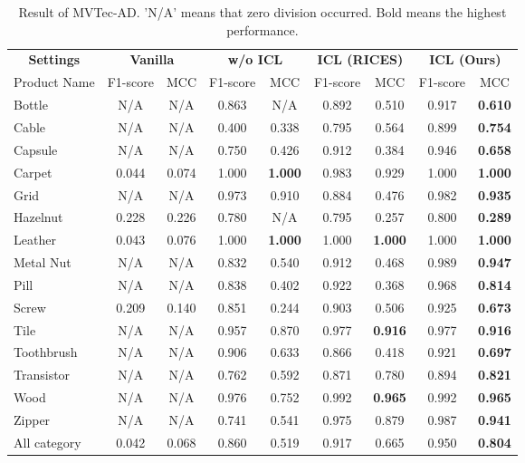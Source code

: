 \begin{table*}[!tb]
\caption{Result of MVTec-AD. 'N/A' means that zero division occurred. Bold means the highest performance.}
\label{tab:result_mvtec}
\centering
\begin{tabular}{lcccccccc}
\toprule
\multicolumn{1}{c}{\textbf{Settings}} & \multicolumn{2}{c}{\textbf{Vanilla}} & \multicolumn{2}{c}{\textbf{w/o ICL}} & \multicolumn{2}{c}{\textbf{ICL (RICES)}} & \multicolumn{2}{c}{\textbf{ICL (Ours)}} \\
\cmidrule(r){1-9}
\multicolumn{1}{c}{Product Name} & F1-score & MCC & F1-score & MCC & F1-score & MCC & F1-score & MCC \\
\midrule
Bottle & N/A & N/A & 0.863 & N/A & 0.892 & 0.510 & 0.917 & \textbf{0.610} \\
Cable & N/A & N/A & 0.400 & 0.338 & 0.795 & 0.564 & 0.899 & \textbf{0.754} \\
Capsule & N/A & N/A & 0.750 & 0.426 & 0.912 & 0.384 & 0.946 & \textbf{0.658} \\
Carpet & 0.044 & 0.074 & 1.000 & \textbf{1.000} & 0.983 & 0.929 & 1.000 & \textbf{1.000}  \\
Grid & N/A & N/A & 0.973 & 0.910 & 0.884 & 0.476 & 0.982 & \textbf{0.935} \\
Hazelnut & 0.228 & 0.226 & 0.780 & N/A & 0.795 & 0.257 & 0.800 & \textbf{0.289} \\
Leather & 0.043 & 0.076 & 1.000 & \textbf{1.000} & 1.000 & \textbf{1.000} & 1.000 & \textbf{1.000} \\
Metal Nut & N/A & N/A & 0.832 & 0.540 & 0.912 & 0.468 & 0.989 & \textbf{0.947} \\
Pill & N/A & N/A & 0.838 & 0.402 & 0.922 & 0.368 & 0.968 & \textbf{0.814} \\
Screw & 0.209 & 0.140 & 0.851 & 0.244 & 0.903 & 0.506 & 0.925 & \textbf{0.673} \\
Tile & N/A & N/A & 0.957 & 0.870 & 0.977 & \textbf{0.916} & 0.977 & \textbf{0.916} \\
Toothbrush & N/A & N/A & 0.906 & 0.633 & 0.866 & 0.418 & 0.921 & \textbf{0.697} \\
Transistor & N/A & N/A & 0.762 & 0.592 & 0.871 & 0.780 & 0.894 & \textbf{0.821} \\
Wood & N/A & N/A & 0.976 & 0.752 & 0.992 & \textbf{0.965} & 0.992 & \textbf{0.965} \\
Zipper & N/A & N/A & 0.741 & 0.541 & 0.975 & 0.879 & 0.987 & \textbf{0.941} \\
\cmidrule(r){1-9}
All category & 0.042 & 0.068 & 0.860 & 0.519 & 0.917 & 0.665 & 0.950 & \textbf{0.804} \\
\bottomrule
\end{tabular}
\end{table*}
